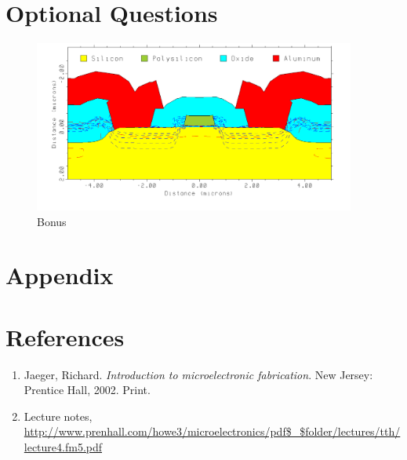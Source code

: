 \documentclass{article}
\begin{document}
\section{Optional Questions}
\begin{figure}[H]
\centering
\includegraphics[width=300pt]{Device_plot_data/bonus1.png}
\caption{Bonus}
\end{figure}

\section{Appendix}
\section{References}
\begin{enumerate}
\item Jaeger, Richard. \textit{Introduction to microelectronic fabrication}. New Jersey: Prentice Hall, 2002. Print.
\item Lecture notes, \url{http://www.prenhall.com/howe3/microelectronics/pdf$_$folder/lectures/tth/lecture4.fm5.pdf}
\end{enumerate}








\end{document}
